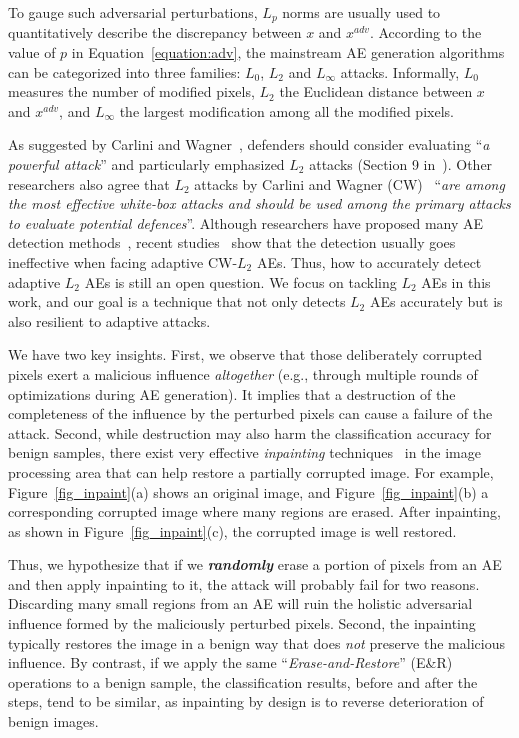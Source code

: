 \documentclass[sigconf]{acmart}
\begin{document}
To gauge such adversarial perturbations, $L_p$ norms are usually used to quantitatively describe the discrepancy between  $x$ and $x^{adv}$. According to the value of $p$ in Equation~\ref{equation:adv}, the mainstream AE generation algorithms can be categorized
into three families: $L_0$, $L_2$ and $L_\infty$ attacks. Informally, $L_0$ measures the number of modified pixels, $L_2$ the Euclidean distance between $x$ and $x^{adv}$, and $L_\infty$ the largest modification among all the modified pixels. 

As suggested by Carlini and Wagner~\cite{carlini2017towards}, defenders should consider evaluating  ``\textit{a powerful attack}'' and particularly  emphasized $L_2$ attacks (Section 9 in~\cite{carlini2017towards}). Other researchers also agree that $L_2$ attacks by Carlini and Wagner (CW)~\cite{carlini2017towards} 
``\textit{are among the most effective white-box attacks and should be used among 
the primary attacks to evaluate potential defences}''\cite{art2018}. 
Although researchers have proposed many AE detection methods~\cite{li2017adversarial,metzen2017detecting,meng2017magnet,xu2017feature}, recent studies~\cite{he2017adversarial,carlini2017magnet,carlini2017adversarial} show that 
the detection usually goes ineffective when facing 
adaptive CW-$L_2$ AEs. 
Thus, how to accurately detect adaptive $L_2$ AEs is still an open question.
We focus on tackling $L_2$ AEs in this work, and  
our goal is a technique that not only detects $L_2$ AEs accurately but is also resilient to adaptive attacks.

We have two key insights. First, we observe that 
those deliberately  corrupted pixels exert a malicious influence \emph{altogether} (e.g., through multiple rounds of optimizations during AE generation). 
It implies that a destruction of the completeness of the influence by the perturbed pixels
can cause a failure of the attack. Second, while destruction may also harm
the classification accuracy for benign samples,
there exist very effective
\emph{inpainting} techniques~\cite{shen2002mathematical,telea2004image,mairal2007sparse} in the image processing area that can help restore a partially corrupted image. For example, Figure~\ref{fig_inpaint}(a) shows an original image, and Figure~\ref{fig_inpaint}(b) a corresponding  corrupted image where many regions are erased. After inpainting, as shown in Figure~\ref{fig_inpaint}(c), the corrupted image is well restored.

Thus, we hypothesize that if we \textbf{\emph{randomly}} erase a portion of  pixels from an AE and then 
apply inpainting to it, the attack will probably fail for two reasons. 
Discarding many small regions from an AE will ruin the holistic adversarial influence formed 
by the maliciously perturbed pixels. Second, the inpainting typically restores the image in a benign way that does \emph{not} preserve the malicious influence. 
By contrast, if we apply the same ``\emph{Erase-and-Restore}'' (E\&R) operations to a benign
sample, the classification results, before and after the steps, tend to be similar, as inpainting 
by design is to reverse deterioration of benign images.
\end{document}
